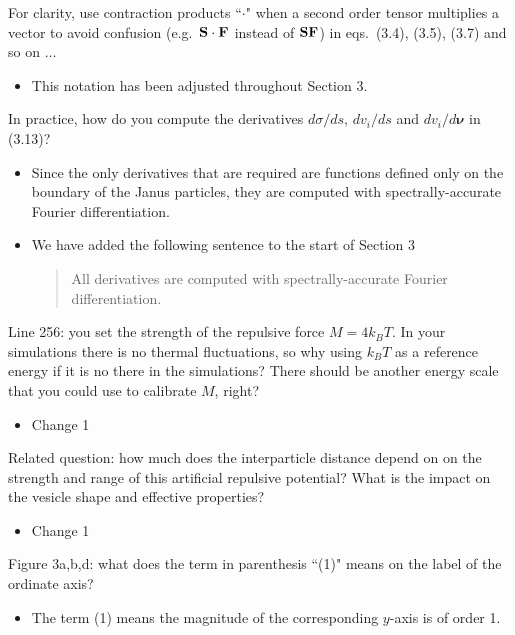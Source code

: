 \documentclass[11pt]{article}
\newcommand{\comment}[1]{{\color{blue} #1}}
\begin{document}
\noindent
\comment{For clarity, use contraction products ``$\cdot$" when a second
order tensor multiplies a vector to avoid confusion (e.g.~${\bf S} \cdot
{\bf F}$ instead of ${\bf SF}$) in eqs.~(3.4), (3.5), (3.7) and so on
$\ldots$}
\begin{itemize}
  \item This notation has been adjusted throughout Section 3.
\end{itemize}

\noindent
\comment{In practice, how do you compute the derivatives $d\sigma /ds$,
$dv_i/ds$ and $dv_i/d\boldsymbol{\nu}$ in (3.13)?}
\begin{itemize}
  \item Since the only derivatives that are required are functions
    defined only on the boundary of the Janus particles, they are
    computed with spectrally-accurate Fourier differentiation.

  \item We have added the following sentence to the start of Section 3
    \begin{quotation}
      All derivatives are computed with spectrally-accurate Fourier
      differentiation.
    \end{quotation}
\end{itemize}

\noindent
\comment{Line 256: you set the strength of the repulsive force $M = 4k_B
T$. In your simulations there is no thermal fluctuations, so why using
$k_B T$ as a reference energy if it is no there in the simulations?
There should be another energy scale that you could use to calibrate
$M$, right?}
\begin{itemize}
  \item Change 1 
\end{itemize}

\noindent
\comment{Related question: how much does the interparticle distance
depend on on the strength and range of this artificial repulsive
potential? What is the impact on the vesicle shape and effective
properties?}
\begin{itemize}
  \item Change 1 
\end{itemize}

\noindent
\comment{Figure 3a,b,d: what does the term in parenthesis ``(1)" means
on the label of the ordinate axis?}
\begin{itemize}
  \item The term (1) means the magnitude of the corresponding $y$-axis is of order 1.
\end{itemize}
\end{document}
